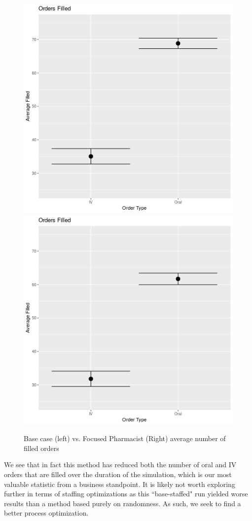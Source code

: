 \documentclass[10pt]{report}            %
\begin{document}
\begin{figure}[H]
\centering
\includegraphics[scale=.35]{BaseFilledCIs.png}
\includegraphics[scale=.35]{ProfFilledCIs.png}
\caption{Base case (left) vs. Focused Pharmacist (Right) average number of filled orders}
\label{fig:baseprofFill}
\end{figure}
We see that in fact this method has reduced both the number of oral and IV orders that are filled over the duration of the simulation, which is our most valuable statistic from a business standpoint. It is likely not worth exploring further in terms of staffing optimizations as this ``base-staffed" run yielded worse results than a method based purely on randomness. As such, we seek to find a better process optimization.
\end{document}
